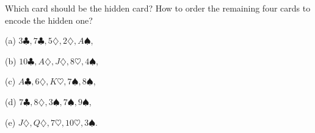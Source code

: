\begin{exercise}\label{card-2}
Which card should be the hidden card? How to order the remaining four cards to encode the hidden one?

(a) $3\clubsuit,7\clubsuit,5\diamondsuit,2\diamondsuit,A\spadesuit$,

(b) $10\clubsuit,A\diamondsuit,J\diamondsuit,8\heartsuit,4\spadesuit$,

(c) $A\clubsuit,6\diamondsuit,K\heartsuit,7\spadesuit,8\spadesuit$,

(d) $7\clubsuit,8\diamondsuit,3\spadesuit,7\spadesuit,9\spadesuit$,

(e) $J\diamondsuit,Q\diamondsuit,7\heartsuit,10\heartsuit,3\spadesuit$.
\end{exercise}
